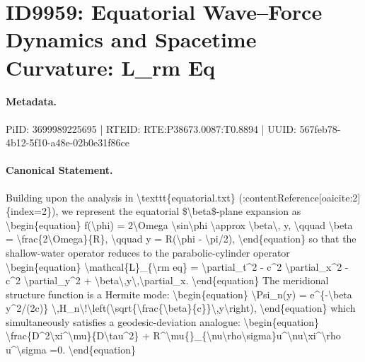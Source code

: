\section*{ID9959: Equatorial Wave–Force Dynamics and Spacetime Curvature: L\_rm Eq}
\paragraph{Metadata.}
PiID: 3699989225695 | RTEID: RTE:P38673.0087:T0.8894 | UUID: 567feb78-4b12-5f10-a48e-02b0e31f86ce

\paragraph{Canonical Statement.}
Building upon the analysis in \textbackslash{}texttt\{equatorial.txt\} (:contentReference[oaicite:2]\{index=2\}), we represent the equatorial \$\textbackslash{}beta\$-plane expansion as \textbackslash{}begin\{equation\} f(\textbackslash{}phi) = 2\textbackslash{}Omega \textbackslash{}sin\textbackslash{}phi \textbackslash{}approx \textbackslash{}beta\textbackslash{}, y, \textbackslash{}qquad \textbackslash{}beta = \textbackslash{}frac\{2\textbackslash{}Omega\}\{R\}, \textbackslash{}qquad y = R(\textbackslash{}phi - \textbackslash{}pi/2), \textbackslash{}end\{equation\} so that the shallow-water operator reduces to the parabolic-cylinder operator \textbackslash{}begin\{equation\} \textbackslash{}mathcal\{L\}\_\{\textbackslash{}rm eq\} = \textbackslash{}partial\_t\textasciicircum{}2 - c\textasciicircum{}2 \textbackslash{}partial\_x\textasciicircum{}2 - c\textasciicircum{}2 \textbackslash{}partial\_y\textasciicircum{}2 + \textbackslash{}beta\textbackslash{},y\textbackslash{},\textbackslash{}partial\_x. \textbackslash{}end\{equation\} The meridional structure function is a Hermite mode: \textbackslash{}begin\{equation\} \textbackslash{}Psi\_n(y) = e\textasciicircum{}\{-\textbackslash{}beta y\textasciicircum{}2/(2c)\} \textbackslash{},H\_n\textbackslash{}!\textbackslash{}left(\textbackslash{}sqrt\{\textbackslash{}frac\{\textbackslash{}beta\}\{c\}\}\textbackslash{},y\textbackslash{}right), \textbackslash{}end\{equation\} which simultaneously satisfies a geodesic-deviation analogue: \textbackslash{}begin\{equation\} \textbackslash{}frac\{D\textasciicircum{}2\textbackslash{}xi\textasciicircum{}\textbackslash{}mu\}\{D\textbackslash{}tau\textasciicircum{}2\} + R\textasciicircum{}\textbackslash{}mu\{\}\_\{\textbackslash{}nu\textbackslash{}rho\textbackslash{}sigma\}u\textasciicircum{}\textbackslash{}nu\textbackslash{}xi\textasciicircum{}\textbackslash{}rho u\textasciicircum{}\textbackslash{}sigma =0. \textbackslash{}end\{equation\}

